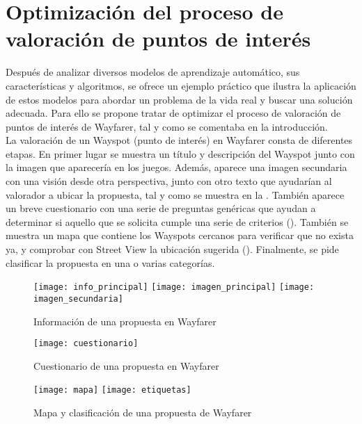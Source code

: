 \chapter{Optimización del proceso de valoración de puntos de interés}

	Después de analizar diversos modelos de aprendizaje automático, sus características y algoritmos, se ofrece un ejemplo práctico que ilustra la aplicación de estos modelos para abordar un problema de la vida real y buscar una solución adecuada. Para ello se propone tratar de optimizar el proceso de valoración de puntos de interés de Wayfarer, tal y como se comentaba en la introducción. \\
	
	La valoración de un Wayspot (punto de interés) en Wayfarer consta de diferentes etapas. En primer lugar se muestra un título y descripción del Wayspot junto con la imagen que aparecería en los juegos. Además, aparece una imagen secundaria con una visión desde otra perspectiva, junto con otro texto que ayudarían al valorador a ubicar la propuesta, tal y como se muestra en la . También aparece un breve cuestionario con una serie de preguntas genéricas que ayudan a determinar si aquello que se solicita cumple una serie de criterios (). También se muestra un mapa que contiene los Wayspots cercanos para verificar que no exista ya, y comprobar con Street View la ubicación sugerida (). Finalmente, se pide clasificar la propuesta en una o varias categorías. 
	
	\begin{figure}[!h]
		\centering
		\texttt{[image: info\_principal]}\hfill
		\texttt{[image: imagen\_principal]}\hfill
		\texttt{[image: imagen\_secundaria]}
		\caption{Información de una propuesta en Wayfarer}
		\label{fig:info_propuesta}
	\end{figure}
	
	\begin{figure}[!h]
		\centering
		\texttt{[image: cuestionario]}
		\caption{Cuestionario de una propuesta en Wayfarer}
		\label{fig:preguntas}
	\end{figure}
	
	\begin{figure}[!h]
		\centering
		\texttt{[image: mapa]}\hfill
		\texttt{[image: etiquetas]}
		\caption{Mapa y clasificación de una propuesta de Wayfarer}
		\label{fig:mapa}
	\end{figure}
	
